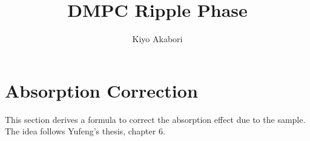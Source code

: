 \documentclass[letterpaper,12pt]{article}
\author{Kiyo Akabori}
\title{DMPC Ripple Phase}
\begin{document}




\section{Absorption Correction}
This section derives a formula to correct the absorption effect due to the sample.
The idea follows Yufeng's thesis, chapter 6. 
\end{document}

